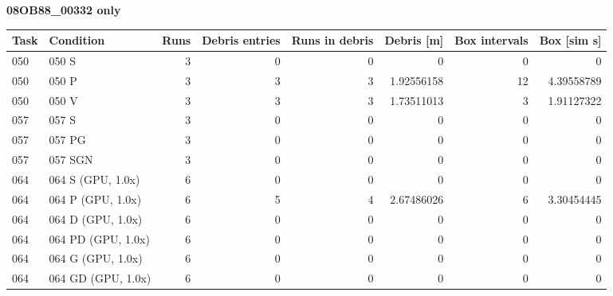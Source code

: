 \par\medskip
\textbf{08OB88\_00332 only}\par\smallskip
\begin{tabular}{llrrrrrr}
\hline
Task & Condition & Runs & Debris entries & Runs in debris & Debris [m] & Box intervals & Box [sim s] \\
\hline
050 & 050 S & 3 & 0 & 0 & 0 & 0 & 0 \\
050 & 050 P & 3 & 3 & 3 & 1.92556158 & 12 & 4.39558789 \\
050 & 050 V & 3 & 3 & 3 & 1.73511013 & 3 & 1.91127322 \\
057 & 057 S & 3 & 0 & 0 & 0 & 0 & 0 \\
057 & 057 PG & 3 & 0 & 0 & 0 & 0 & 0 \\
057 & 057 SGN & 3 & 0 & 0 & 0 & 0 & 0 \\
064 & 064 S (GPU, 1.0x) & 6 & 0 & 0 & 0 & 0 & 0 \\
064 & 064 P (GPU, 1.0x) & 6 & 5 & 4 & 2.67486026 & 6 & 3.30454445 \\
064 & 064 D (GPU, 1.0x) & 6 & 0 & 0 & 0 & 0 & 0 \\
064 & 064 PD (GPU, 1.0x) & 6 & 0 & 0 & 0 & 0 & 0 \\
064 & 064 G (GPU, 1.0x) & 6 & 0 & 0 & 0 & 0 & 0 \\
064 & 064 GD (GPU, 1.0x) & 6 & 0 & 0 & 0 & 0 & 0 \\
\hline
\end{tabular}
